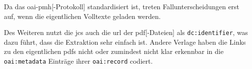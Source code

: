Da das \gls{oai-pmh}[-Protokoll] standardisiert ist,
treten Fallunterscheidungen erst auf,
wenn die eigentlichen Volltexte geladen werden.

Des Weiteren nutzt die \gls{jcs}
auch die \gls{url} der \gls{pdf}[-Dateien]
als \texttt{dc:identifier},
was dazu führt,
dass die Extraktion sehr einfach ist.
Andere Verlage haben die Links zu den eigentlichen \glspl{pdf}
nicht oder zumindest nicht klar erkennbar
in die \texttt{oai:metadata} Einträge ihrer
\texttt{oai:record} codiert.